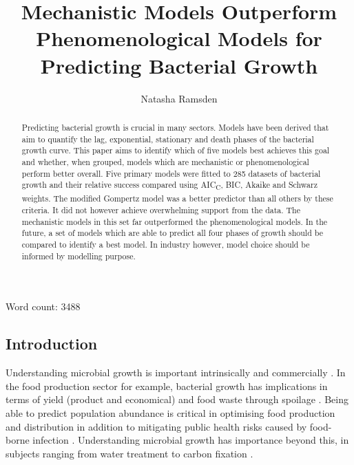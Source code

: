 \documentclass[11pt]{article}
\title{Mechanistic Models Outperform Phenomenological Models for Predicting Bacterial Growth}
\author[1]{Natasha Ramsden}
\affil[1]{Imperial College London}
\date{}
\begin{document}
    \begin{titlepage}
    \maketitle
    \thispagestyle{empty}
    
    \begin{center}
        Word count: 3488
    \end{center}
    
    \end{titlepage}

    \begin{linenumbers}
    
    \begin{abstract}
        
        Predicting bacterial growth is crucial in many sectors. Models have been derived that aim to quantify the lag, exponential, stationary and death phases of the bacterial growth curve. This paper aims to identify which of five models best achieves this goal and whether, when grouped, models which are mechanistic or phenomenological perform better overall. Five primary models were fitted to 285 datasets of bacterial growth and their relative success compared using AIC\textsubscript{C}, BIC, Akaike and Schwarz weights. The modified Gompertz model was a better predictor than all others by these criteria. It did not however achieve overwhelming support from the data. The mechanistic models in this set far outperformed the phenomenological models. In the future, a set of models which are able to predict all four phases of growth should be compared to identify a best model. In industry however, model choice should be informed by modelling purpose.

    \end{abstract}


    \section{Introduction}
    
        Understanding microbial growth is important intrinsically and commercially \citep{najafpour_chapter_2007}. In the food production sector for example, bacterial growth has implications in terms of yield (product and economical) and food waste through spoilage \citep{zwietering_modeling_1990}. Being able to predict population abundance is critical in optimising food production and distribution in addition to mitigating public health risks caused by food-borne infection \citep{ross_modeling_2003, mahdinia_microbial_2020}. Understanding microbial growth has importance beyond this, in subjects ranging from water treatment to carbon fixation \citep{esser_modeling_2015}.
        

\end{linenumbers}
\end{document}
